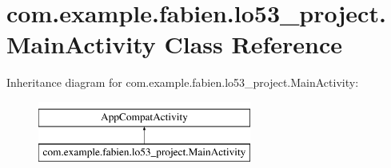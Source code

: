 \hypertarget{classcom_1_1example_1_1fabien_1_1lo53__project_1_1MainActivity}{\section{com.\-example.\-fabien.\-lo53\-\_\-project.\-Main\-Activity Class Reference}
\label{classcom_1_1example_1_1fabien_1_1lo53__project_1_1MainActivity}
}
Inheritance diagram for com.\-example.\-fabien.\-lo53\-\_\-project.\-Main\-Activity\-:\begin{figure}[H]
\begin{center}
\leavevmode
\includegraphics[height=2.000000cm]{classcom_1_1example_1_1fabien_1_1lo53__project_1_1MainActivity}
\end{center}
\end{figure}
